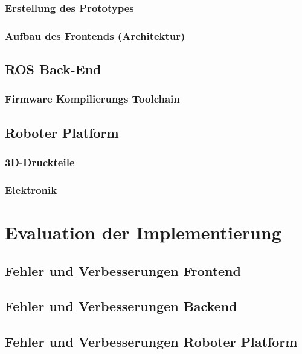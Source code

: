 \documentclass[11pt,oneside,a4paper,titlepage]{article}
\begin{document}
\subsubsection{Erstellung des Prototypes}


\subsubsection{Aufbau des Frontends (Architektur)}



\subsection{ROS Back-End}
\subsubsection{Firmware Kompilierungs Toolchain}



\pagebreak
\subsection{Roboter Platform}
\subsubsection{3D-Druckteile}


\subsubsection{Elektronik}


\section{Evaluation der Implementierung}

\subsection{Fehler und Verbesserungen Frontend}


\subsection{Fehler und Verbesserungen Backend}


\subsection{Fehler und Verbesserungen Roboter Platform}

\end{document}
